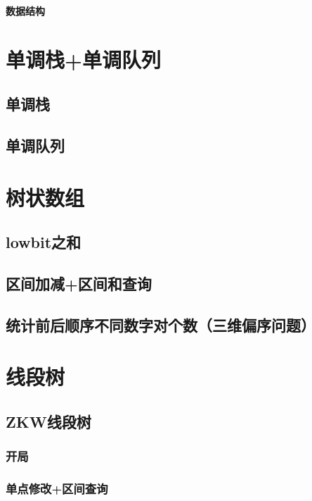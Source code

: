 \documentclass{article}
\begin{document}
\begin{titlepage}

\thispagestyle{empty}
\pagebreak
\textbf{数据结构}
\pagestyle{plain}
\tableofcontents
\end{titlepage}


\hspace{3em}
\section{﻿单调栈+单调队列}
\subsection{单调栈}

\subsection{单调队列}


\section{树状数组}
\subsection{lowbit之和}

\subsection{区间加减+区间和查询}

\subsection{统计前后顺序不同数字对个数（三维偏序问题）}


\section{线段树}
\subsection{ZKW线段树}
\subsubsection{开局}

\subsubsection{单点修改+区间查询}

\end{document}
